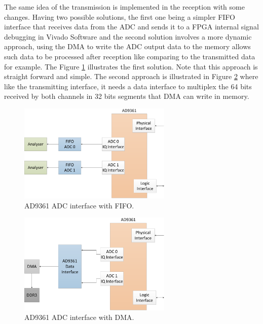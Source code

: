 The same idea of the transmission is implemented in the reception with some
changes. Having two possible solutions, the first one being a simpler FIFO
interface that receives data from the ADC and sends it to a FPGA internal signal
debugging in Vivado Software and the second solution involves a more dynamic
approach, using the DMA to write the ADC output data to the memory allows such
data to be processed after reception like comparing to the transmitted data for
example. The Figure \ref{fig:ad9361rxfifo} illustrates the first solution. Note
that this approach is straight forward and simple. The second approach is
illustrated in Figure \ref{fig:ad9361rxdma} where like the transmitting
interface, it needs a data interface to multiplex the 64 bits received by both
channels in 32 bits segments that DMA can write in memory.


\begin{figure}[htbp]
    \centering
    \includegraphics[width=0.65\textwidth]{./figures/adc_fifo}
    \caption{ AD9361 ADC interface with FIFO.
    \label{fig:ad9361rxfifo}}
\end{figure}

\begin{figure}[htbp]
    \centering
    \includegraphics[width=0.65\textwidth]{./figures/adc_dma}
    \caption{ AD9361 ADC interface with DMA.
    \label{fig:ad9361rxdma}}
\end{figure}


